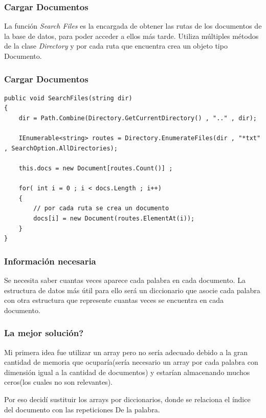 \documentclass{beamer}
\begin{document}
\begin{frame}
    \frametitle{Cargar Documentos}

    La función \textit{Search Files} es la encargada de obtener las rutas de los documentos de la base de datos, para poder acceder
    a ellos más tarde. Utiliza múltiples métodos de la clase \textit{Directory} y por cada ruta que encuentra crea un objeto tipo Documento.        
\end{frame}

\begin{frame}[fragile]
    \frametitle{Cargar Documentos}
    \begin{lstlisting} 
public void SearchFiles(string dir)
{            
    dir = Path.Combine(Directory.GetCurrentDirectory() , ".." , dir);
    
    IEnumerable<string> routes = Directory.EnumerateFiles(dir , "*txt" , SearchOption.AllDirectories);
                
    this.docs = new Document[routes.Count()] ;
                
    for( int i = 0 ; i < docs.Length ; i++)
    {
        // por cada ruta se crea un documento
        docs[i] = new Document(routes.ElementAt(i));
    }
}    
    \end{lstlisting}         

\end{frame}

\begin{frame}
    \frametitle{Información necesaria}
    Se necesita saber cuantas veces aparece cada palabra en cada documento. La estructura de datos más útil para ello será
    un diccionario que asocie cada palabra con otra estructura que represente cuantas veces se encuentra en cada documento.
\end{frame}

\begin{frame}
    \frametitle{La mejor solución?}
    Mi primera idea fue utilizar un array pero no sería adecuado debido a la gran cantidad de memoria que ocuparía(sería necesario un
    array por cada palabra con dimensión igual a la cantidad de documentos) y estarían almacenando muchos ceros(los cuales no son relevantes).

    Por eso decidí sustituir los arrays por diccionarios, donde se relaciona el índice del documento con las repeticiones De
    la palabra.
\end{frame}
\end{document}
